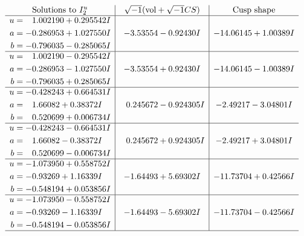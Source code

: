 \documentclass[1p]{elsarticle_modified}
\theoremstyle{definition}
\newcommand{\I}{\sqrt{-1}}
\begin{document}
$$\begin{array}{c|c|c}  
\text{Solutions to }I^u_{2}& \I (\text{vol} + \sqrt{-1}CS) & \text{Cusp shape}\\
 \hline 
\begin{aligned}
u &= \phantom{-}1.002190 + 0.295542 I \\
a &= -0.286953 + 1.027550 I \\
b &= -0.796035 - 0.285065 I\end{aligned}
 & -3.53554 - 0.92430 I & -14.06145 + 1.00389 I \\ \hline\begin{aligned}
u &= \phantom{-}1.002190 - 0.295542 I \\
a &= -0.286953 - 1.027550 I \\
b &= -0.796035 + 0.285065 I\end{aligned}
 & -3.53554 + 0.92430 I & -14.06145 - 1.00389 I \\ \hline\begin{aligned}
u &= -0.428243 + 0.664531 I \\
a &= \phantom{-}1.66082 + 0.38372 I \\
b &= \phantom{-}0.520699 + 0.006734 I\end{aligned}
 & \phantom{-}0.245672 - 0.924305 I & -2.49217 - 3.04801 I \\ \hline\begin{aligned}
u &= -0.428243 - 0.664531 I \\
a &= \phantom{-}1.66082 - 0.38372 I \\
b &= \phantom{-}0.520699 - 0.006734 I\end{aligned}
 & \phantom{-}0.245672 + 0.924305 I & -2.49217 + 3.04801 I \\ \hline\begin{aligned}
u &= -1.073950 + 0.558752 I \\
a &= -0.93269 + 1.16339 I \\
b &= -0.548194 + 0.053856 I\end{aligned}
 & -1.64493 + 5.69302 I & -11.73704 + 0.42566 I \\ \hline\begin{aligned}
u &= -1.073950 - 0.558752 I \\
a &= -0.93269 - 1.16339 I \\
b &= -0.548194 - 0.053856 I\end{aligned}
 & -1.64493 - 5.69302 I & -11.73704 - 0.42566 I\\
 \hline 
 \end{array}$$\newpage
\newpage\renewcommand{\arraystretch}{1}
\end{document}
